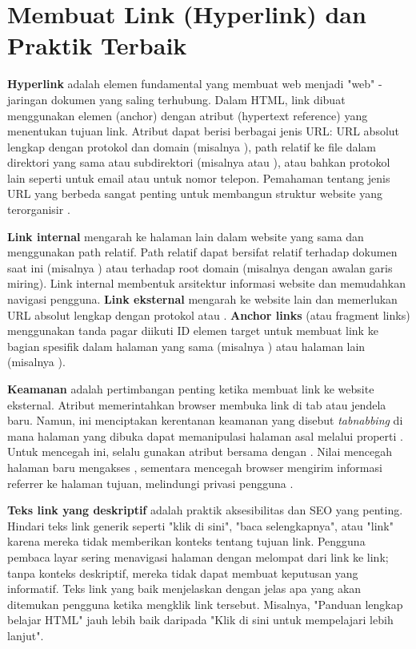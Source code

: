 \section{Membuat Link (Hyperlink) dan Praktik Terbaik}

\textbf{Hyperlink} adalah elemen fundamental yang membuat web menjadi "web" - jaringan dokumen yang saling terhubung. Dalam HTML, link dibuat menggunakan elemen  (anchor) dengan atribut  (hypertext reference) yang menentukan tujuan link. Atribut  dapat berisi berbagai jenis URL: URL absolut lengkap dengan protokol dan domain (misalnya ), path relatif ke file dalam direktori yang sama atau subdirektori (misalnya  atau ), atau bahkan protokol lain seperti  untuk email atau  untuk nomor telepon. Pemahaman tentang jenis URL yang berbeda sangat penting untuk membangun struktur website yang terorganisir \cite{webdevHtml}.

\textbf{Link internal} mengarah ke halaman lain dalam website yang sama dan menggunakan path relatif. Path relatif dapat bersifat relatif terhadap dokumen saat ini (misalnya ) atau terhadap root domain (misalnya  dengan awalan garis miring). Link internal membentuk arsitektur informasi website dan memudahkan navigasi pengguna. \textbf{Link eksternal} mengarah ke website lain dan memerlukan URL absolut lengkap dengan protokol  atau . \textbf{Anchor links} (atau fragment links) menggunakan tanda pagar \code{\#} diikuti ID elemen target untuk membuat link ke bagian spesifik dalam halaman yang sama (misalnya ) atau halaman lain (misalnya ).

\textbf{Keamanan} adalah pertimbangan penting ketika membuat link ke website eksternal. Atribut  memerintahkan browser membuka link di tab atau jendela baru. Namun, ini menciptakan kerentanan keamanan yang disebut \textit{tabnabbing} di mana halaman yang dibuka dapat memanipulasi halaman asal melalui properti . Untuk mencegah ini, selalu gunakan atribut  bersama dengan . Nilai  mencegah halaman baru mengakses , sementara  mencegah browser mengirim informasi referrer ke halaman tujuan, melindungi privasi pengguna \cite{mdnHtmlIntro}.

\textbf{Teks link yang deskriptif} adalah praktik aksesibilitas dan SEO yang penting. Hindari teks link generik seperti "klik di sini", "baca selengkapnya", atau "link" karena mereka tidak memberikan konteks tentang tujuan link. Pengguna pembaca layar sering menavigasi halaman dengan melompat dari link ke link; tanpa konteks deskriptif, mereka tidak dapat membuat keputusan yang informatif. Teks link yang baik menjelaskan dengan jelas apa yang akan ditemukan pengguna ketika mengklik link tersebut. Misalnya, "Panduan lengkap belajar HTML" jauh lebih baik daripada "Klik di sini untuk mempelajari lebih lanjut".

